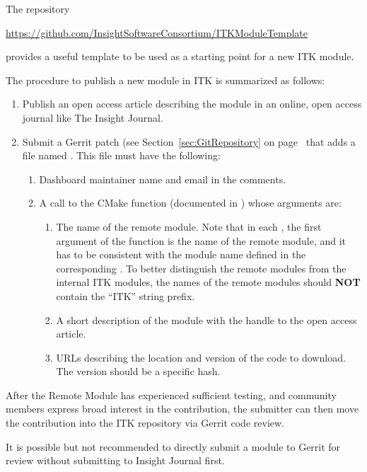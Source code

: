 The repository
\begin{center}
  \url{https://github.com/InsightSoftwareConsortium/ITKModuleTemplate}
\end{center}

provides a useful template to be used as a starting point for a new ITK module.

The procedure to publish a new module in ITK is summarized as follows:
\begin{enumerate}
\item Publish an open access article describing the module in an online, open
  access journal like The Insight Journal.
\item Submit a Gerrit patch (see Section~\ref{sec:GitRepository} on
  page~\pageref{sec:GitRepository} that adds a file named
  . This file must have the
  following:
  \begin{enumerate}
    \item Dashboard maintainer name and email in the comments.
    \item A call to the  CMake function (documented in
      ) whose arguments are:
      \begin{enumerate}
      \item The name of the remote module. Note that in each
        , the first argument of the function
         is the name of the remote module, and it has to be
        consistent with the module name defined in the corresponding
        . To better distinguish the remote
        modules from the internal ITK modules, the names of the remote modules should
        \textbf{NOT} contain the ``ITK'' string prefix.
      \item A short description of the module with the handle to the open access
        article.
      \item URLs describing the location and version of the code to download. The
        version should be a specific hash.
      \end{enumerate}
  \end{enumerate}
\end{enumerate}

After the Remote Module has experienced sufficient testing, and community
members express broad interest in the contribution, the submitter can then move
the contribution into the ITK repository via Gerrit code review.

It is possible but not recommended to directly submit a module to Gerrit for
review without submitting to Insight Journal first.
